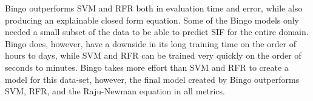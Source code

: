 Bingo outperforms SVM and RFR both in evaluation time and error, while also producing an explainable closed form equation. Some of the Bingo models only needed a small subset of the data to be able to predict SIF for the entire domain. Bingo does, however, have a downside in its long training time on the order of hours to days, while SVM and RFR can be trained very quickly on the order of seconds to minutes. Bingo takes more effort than SVM and RFR to create a model for this data-set, however, the final model created by Bingo outperforms SVM, RFR, and the Raju-Newman equation in all metrics. 





